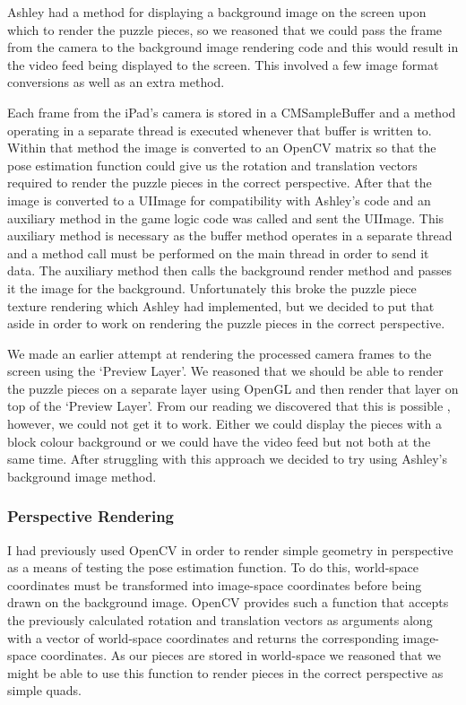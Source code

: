 \documentclass{article}
\begin{document}
Ashley had a method for displaying a background image on the screen upon which to render the puzzle pieces, so we reasoned that we could pass the frame from the camera to the background image rendering code and this would result in the video feed being displayed to the screen. This involved a few image format conversions as well as an extra method.

Each frame from the iPad's camera is stored in a CMSampleBuffer and a method operating in a separate thread is executed whenever that buffer is written to. Within that method the image is converted to an OpenCV matrix so that the pose estimation function could give us the rotation and translation vectors required to render the puzzle pieces in the correct perspective. %
After that the image is converted to a UIImage for compatibility with Ashley's code and an auxiliary method in the game logic code was called and sent the UIImage. This auxiliary method is necessary as the buffer method operates in a separate thread and a method call must be performed on the main thread in order to send it data. The auxiliary method then calls the background render method and passes it the image for the background. %
Unfortunately this broke the puzzle piece texture rendering which Ashley had implemented, but we decided to put that aside in order to work on rendering the puzzle pieces in the correct perspective.

We made an earlier attempt at rendering the processed camera frames to the screen using the `Preview Layer'. We reasoned that we should be able to render the puzzle pieces on a separate layer using OpenGL and then render that layer on top of the `Preview Layer'. From our reading we discovered that this is possible \cite{preview}, however, we could not get it to work. Either we could display the pieces with a block colour background or we could have the video feed but not both at the same time. After struggling with this approach we decided to try using Ashley's background image method.

\subsubsection{Perspective Rendering}

I had previously used OpenCV in order to render simple geometry in perspective as a means of testing the pose estimation function. To do this, world-space coordinates must be transformed into image-space coordinates before being drawn on the background image. OpenCV provides such a function that accepts the previously calculated rotation and translation vectors as arguments along with a vector of world-space coordinates and returns the corresponding image-space coordinates. As our pieces are stored in world-space we reasoned that we might be able to use this function to render pieces in the correct perspective as simple quads. 
\end{document}
